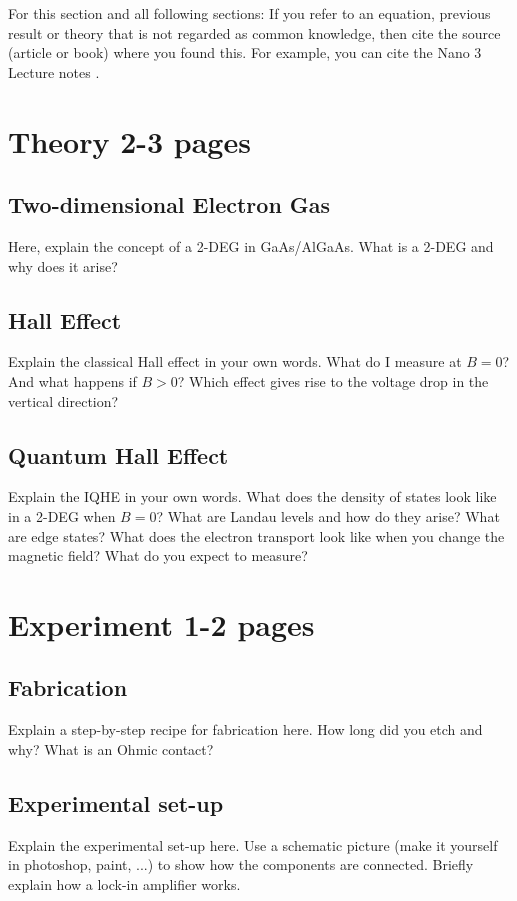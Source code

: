 \documentclass[a4paper]{article}
\begin{document}
For this section and all following sections: If you refer to an equation, previous result or theory that is not regarded as common knowledge, then cite the source (article or book) where you found this. For example, you can cite the Nano 3 Lecture notes \cite{nano3}.


\section{Theory 2-3 pages}
\label{sec:theory}

\subsection{Two-dimensional Electron Gas}
Here, explain the concept of a 2-DEG in GaAs/AlGaAs. What is a 2-DEG and why does it arise?

\subsection{Hall Effect}
Explain the classical Hall effect in your own words. What do I measure at $B=0$? And what happens if $B>0$? Which effect gives rise to the voltage drop in the vertical direction?

\subsection{Quantum Hall Effect}
Explain the IQHE in your own words. What does the density of states look like in a 2-DEG when $B=0$? What are Landau levels and how do they arise? What are edge states? What does the electron transport look like when you change the magnetic field? What do you expect to measure?

\section{Experiment 1-2 pages}
\subsection{Fabrication}
Explain a step-by-step recipe for fabrication here. How long did you etch and why? What is an Ohmic contact?
\subsection{Experimental set-up}
Explain the experimental set-up here. Use a schematic picture (make it yourself in photoshop, paint, ...) to show how the components are connected. Briefly explain how a lock-in amplifier works.
\end{document}
